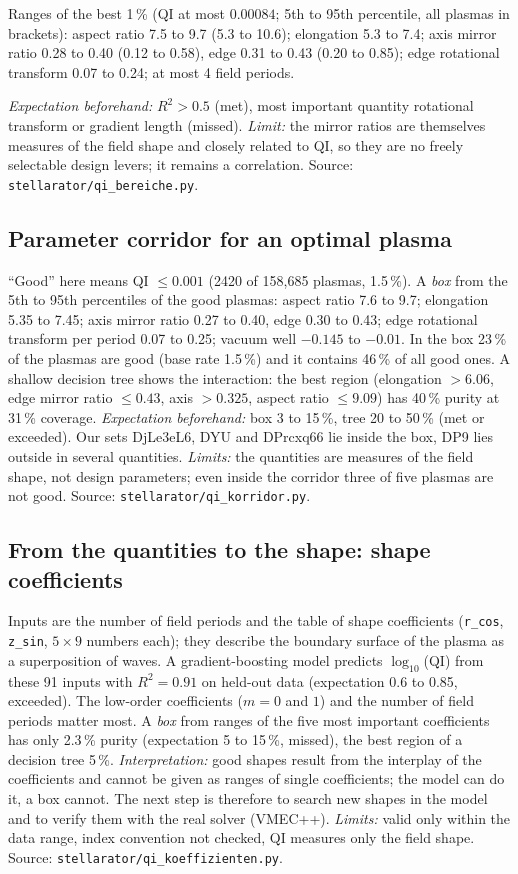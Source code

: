 Ranges of the best 1\,\% (QI at most $0.00084$; 5th to 95th percentile, all plasmas in brackets):
aspect ratio 7.5 to 9.7 (5.3 to 10.6); elongation 5.3 to 7.4; axis mirror ratio 0.28 to 0.40 (0.12 to 0.58),
edge 0.31 to 0.43 (0.20 to 0.85); edge rotational transform 0.07 to 0.24; at most 4 field periods.

\emph{Expectation beforehand:} $R^2>0.5$ (met), most important quantity rotational transform or gradient length
(missed). \emph{Limit:} the mirror ratios are themselves measures of the field shape and closely related to QI, so
they are no freely selectable design levers; it remains a correlation. Source: \texttt{stellarator/qi\_bereiche.py}.

\subsection*{Parameter corridor for an optimal plasma}
``Good'' here means QI $\le 0.001$ (2420 of 158,685 plasmas, 1.5\,\%). A \emph{box} from the 5th to 95th percentiles of the good plasmas:
aspect ratio 7.6 to 9.7; elongation 5.35 to 7.45; axis mirror ratio 0.27 to 0.40, edge 0.30 to 0.43; edge rotational transform per period
0.07 to 0.25; vacuum well $-0.145$ to $-0.01$. In the box 23\,\% of the plasmas are good (base rate 1.5\,\%) and it contains 46\,\% of all good ones.
A shallow decision tree shows the interaction: the best region (elongation $>6.06$, edge mirror ratio $\le0.43$, axis $>0.325$,
aspect ratio $\le9.09$) has 40\,\% purity at 31\,\% coverage. \emph{Expectation beforehand:} box 3 to 15\,\%, tree 20 to 50\,\% (met or exceeded).
Our sets DjLe3eL6, DYU and DPrcxq66 lie inside the box, DP9 lies outside in several quantities.
\emph{Limits:} the quantities are measures of the field shape, not design parameters; even inside the corridor three of five plasmas are not good. Source: \texttt{stellarator/qi\_korridor.py}.

\subsection*{From the quantities to the shape: shape coefficients}
Inputs are the number of field periods and the table of shape coefficients (\texttt{r\_cos}, \texttt{z\_sin}, $5\times9$ numbers each); they describe the boundary surface of the plasma
as a superposition of waves. A gradient-boosting model predicts $\log_{10}$(QI) from these 91 inputs with $R^2=0.91$ on held-out data
(expectation 0.6 to 0.85, exceeded). The low-order coefficients ($m=0$ and $1$) and the number of field periods matter most.
A \emph{box} from ranges of the five most important coefficients has only 2.3\,\% purity (expectation 5 to 15\,\%, missed), the best region of a decision tree 5\,\%.
\emph{Interpretation:} good shapes result from the interplay of the coefficients and cannot be given as ranges of single coefficients; the model can do it, a box cannot.
The next step is therefore to search new shapes in the model and to verify them with the real solver (VMEC++).
\emph{Limits:} valid only within the data range, index convention not checked, QI measures only the field shape. Source: \texttt{stellarator/qi\_koeffizienten.py}.


